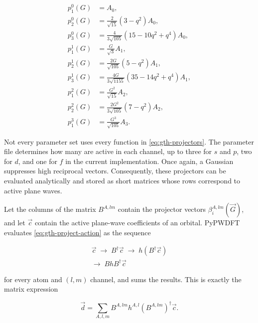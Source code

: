 \begin{align}
    p_{1}^{0}(G) &= A_{0},\\
    p_{2}^{0}(G) &= \frac{2}{\sqrt{15}}(3-q^{2})A_{0},\\
    p_{3}^{0}(G) &= \frac{4}{3\sqrt{105}}(15-10q^{2}+q^{4})A_{0},\\[2mm]
    p_{1}^{1}(G) &= \frac{G}{\sqrt{3}}A_{1},\\
    p_{2}^{1}(G) &= \frac{2G}{\sqrt{105}}(5-q^{2})A_{1},\\
    p_{3}^{1}(G) &= \frac{4G}{3\sqrt{1155}}(35-14q^{2}+q^{4})A_{1},\\[2mm]
    p_{1}^{2}(G) &= \frac{G^{2}}{\sqrt{15}}A_{2},\\
    p_{2}^{2}(G) &= \frac{2G^{2}}{3\sqrt{105}}(7-q^{2})A_{2},\\[2mm]
    p_{1}^{3}(G) &= \frac{G^{3}}{\sqrt{105}}A_{3}.
    \label{eq:gth-projectors}
\end{align}

Not every parameter set uses every function in \cref{eq:gth-projectors}. The parameter file determines how many are active in each channel, up to three for $s$ and $p$, two for $d$, and one for $f$ in the current implementation. Once again, a Gaussian suppresses high reciprocal vectors. Consequently, these projectors can be evaluated analytically and stored as short matrices whose rows correspond to active plane waves.

Let the columns of the matrix $B^{A,lm}$ contain the projector vectors $\beta_{i}^{A,lm}(\vec{G})$, and let $\vec{c}$ contain the active plane-wave coefficients of an orbital. PyPWDFT evaluates \cref{eq:gth-project-action} as the sequence

\begin{equation}
    \boxed{
    \begin{gathered}
        \vec{c}\;\longrightarrow\;B^{\dagger}\vec{c}
        \;\longrightarrow\;h\left(B^{\dagger}\vec{c}\right)\\
        \longrightarrow\;B h B^{\dagger}\vec{c}
    \end{gathered}}
    \label{eq:gth-matrix-action}
\end{equation}

for every atom and $(l,m)$ channel, and sums the results. This is exactly the matrix expression

\begin{equation}
    \vec{d} = \sum_{A,l,m} B^{A,lm}h^{A,l}
    \left(B^{A,lm}\right)^{\dagger}\vec{c}.
    \label{eq:gth-code-action}
\end{equation}

